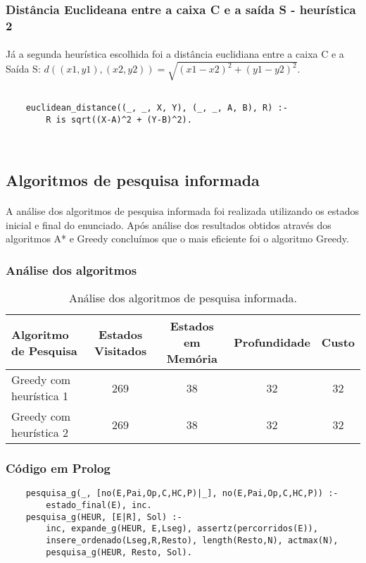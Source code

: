 \documentclass{article}
\begin{document}
\subsubsection{Distância Euclideana entre a caixa C e a saída S - heurística 2}
\paragraph{} Já a segunda heurística escolhida foi a distância euclidiana entre a caixa C e a Saída S: $d((x1, y1), (x2, y2)) = \sqrt{(x1-x2)^2 + (y1-y2)^2}$.

\begin{verbatim}

    euclidean_distance((_, _, X, Y), (_, _, A, B), R) :- 
        R is sqrt((X-A)^2 + (Y-B)^2).

        
\end{verbatim}


\subsection{Algoritmos de pesquisa informada}
\paragraph{} A análise dos algoritmos de pesquisa informada foi realizada utilizando os estados inicial e final do enunciado. Após análise dos resultados obtidos através dos algoritmos A* e Greedy concluímos que o mais eficiente foi o algoritmo Greedy.
\subsubsection{Análise dos algoritmos}

\begin{table}[h]
\centering
\begin{tabular}{l|c|c|c|c}
Algoritmo de Pesquisa & Estados Visitados & Estados em Memória & Profundidade & Custo \\\hline
Greedy com heurística 1 & 269 & 38 & 32 & 32 \\\hline
Greedy com heurística 2 & 269 & 38 & 32 & 32
\end{tabular}
\caption{\label{tab:pni}Análise dos algoritmos de pesquisa informada.}
\end{table}

\subsubsection{Código em Prolog}
\begin{verbatim}
    pesquisa_g(_, [no(E,Pai,Op,C,HC,P)|_], no(E,Pai,Op,C,HC,P)) :- 
        estado_final(E), inc.
    pesquisa_g(HEUR, [E|R], Sol) :- 
        inc, expande_g(HEUR, E,Lseg), assertz(percorridos(E)),
        insere_ordenado(Lseg,R,Resto), length(Resto,N), actmax(N),
        pesquisa_g(HEUR, Resto, Sol).
\end{verbatim}
 
\end{document}
